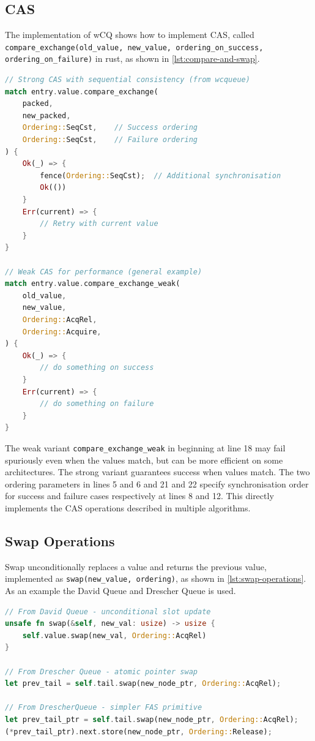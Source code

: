 \subsection{\acf{CAS}}

The implementation of \ac{wCQ} shows how to implement \ac{CAS}, called \newline \texttt{compare\_exchange(old\_value, new\_value, ordering\_on\_success, \newline ordering\_on\_failure)} in rust, as shown in \cref{lst:compare-and-swap}.

\begin{lstlisting}[language=Rust, style=boxed, caption={Compare-and-swap variants and usage patterns}, label={lst:compare-and-swap}]
// Strong CAS with sequential consistency (from wcqueue)
match entry.value.compare_exchange(
    packed,
    new_packed,
    Ordering::SeqCst,    // Success ordering
    Ordering::SeqCst,    // Failure ordering
) {
    Ok(_) => {
        fence(Ordering::SeqCst);  // Additional synchronisation
        Ok(())
    }
    Err(current) => {
        // Retry with current value
    }
}

// Weak CAS for performance (general example)
match entry.value.compare_exchange_weak(
    old_value,
    new_value,
    Ordering::AcqRel,
    Ordering::Acquire,
) {
    Ok(_) => {
        // do something on success
    }
    Err(current) => {
        // do something on failure
    }
}
\end{lstlisting}

The weak variant \texttt{compare\_exchange\_weak} in beginning at line 18 may fail spuriously even when the values match, but can be more efficient on some architectures. The strong variant guarantees success when values match. The two ordering parameters in lines 5 and 6 and 21 and 22 specify synchronisation order for success and failure cases respectively at lines 8 and 12. This directly implements the CAS operations described in multiple algorithms.

\subsection{Swap Operations}

Swap unconditionally replaces a value and returns the previous value, implemented as \texttt{swap(new\_value, ordering)}, as shown in \cref{lst:swap-operations}. As an example the David Queue and Drescher Queue is used.

\begin{lstlisting}[language=Rust, style=boxed, caption={Unconditional atomic swap operations}, label={lst:swap-operations}]
// From David Queue - unconditional slot update
unsafe fn swap(&self, new_val: usize) -> usize {
    self.value.swap(new_val, Ordering::AcqRel)
}

// From Drescher Queue - atomic pointer swap
let prev_tail = self.tail.swap(new_node_ptr, Ordering::AcqRel);

// From DrescherQueue - simpler FAS primitive
let prev_tail_ptr = self.tail.swap(new_node_ptr, Ordering::AcqRel);
(*prev_tail_ptr).next.store(new_node_ptr, Ordering::Release);
\end{lstlisting}

